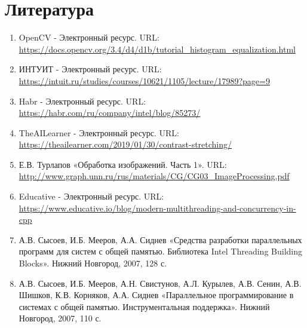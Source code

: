 \documentclass{report}
\begin{document}
\section*{Литература}
\begin{enumerate}
\item OpenCV - Электронный ресурс. URL: \newline \url{https://docs.opencv.org/3.4/d4/d1b/tutorial_histogram_equalization.html}
\item ИНТУИТ - Электронный ресурс. URL: \newline \url{https://intuit.ru/studies/courses/10621/1105/lecture/17989?page=9}
\item Habr - Электронный ресурс. URL: \newline \url{https://habr.com/ru/company/intel/blog/85273/}
\item TheAILearner - Электронный ресурс. URL: \newline \url{https://theailearner.com/2019/01/30/contrast-stretching/}
\item Е.В. Турлапов «Обработка изображений. Часть 1». URL: \newline \url{http://www.graph.unn.ru/rus/materials/CG/CG03_ImageProcessing.pdf}
\item Educative - Электронный ресурс. URL: \newline \url{https://www.educative.io/blog/modern-multithreading-and-concurrency-in-cpp}
\item А.В. Сысоев, И.Б. Мееров, А.А. Сиднев «Средства разработки параллельных программ для систем с общей памятью. Библиотека Intel Threading Building Blocks». Нижний Новгород, 2007, 128 с. 
\item А.В. Сысоев, И.Б. Мееров, А.Н. Свистунов, А.Л. Курылев, А.В. Сенин, А.В. Шишков, К.В. Корняков, А.А. Сиднев «Параллельное программирование в системах с общей
памятью. Инструментальная поддержка». Нижний Новгород, 2007, 110 с. 
\end{enumerate} 
\newpage

\end{document}
